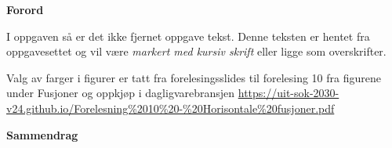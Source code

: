 \documentclass[
  12pt,
  a4paper,
  DIV=11,
  numbers=noendperiod]{scrartcl}
\renewcommand*\contentsname{Table of contents}
\newcommand\contentsname{Table of contents}
\begin{document}







\thispagestyle{plain}
\begin{center}
    \Large
    \textbf{Forord}
\end{center}

I oppgaven så er det ikke fjernet oppgave tekst. Denne teksten er hentet fra oppgavesettet og vil være \textit{markert med kursiv skrift} eller ligge som overskrifter.

Valg av farger i figurer er tatt fra forelesingsslides til forelesing 10 fra figurene under Fusjoner og oppkjøp i dagligvarebransjen  \url{https://uit-sok-2030-v24.github.io/Forelesning%2010%20-%20Horisontale%20fusjoner.pdf}


\begin{center}
    \Large
    \textbf{Sammendrag}
\end{center}


\newpage
\hypersetup{linkcolor=black}
\renewcommand{\contentsname}{Innholdsfortegnelse}
\renewcommand*{\figureautorefname}{Figur}
\renewcommand*{\tableautorefname}{Tabell}
\tableofcontents
\listoffigures
\listoftables
\hypersetup{linkcolor=blue}
\newpage
\end{document}
